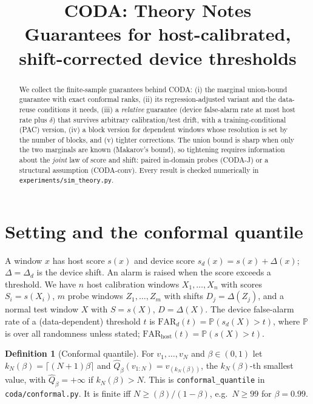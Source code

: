 \documentclass[conference]{IEEEtran}
\theoremstyle{definition}
\newtheorem{definition}{Definition}
\theoremstyle{remark}
\newcommand{\Q}{\widehat Q}
\newcommand{\Prob}{\mathbb P}
\newcommand{\FAR}{\mathrm{FAR}}
\begin{document}
\title{CODA: Theory Notes\\{\normalsize Guarantees for host-calibrated, shift-corrected device thresholds}}
\author{}
\maketitle

\begin{abstract}
We collect the finite-sample guarantees behind CODA: (i) the marginal union-bound guarantee with exact conformal ranks, (ii) its regression-adjusted variant and the data-reuse conditions it needs, (iii) a \emph{relative} guarantee (device false-alarm rate at most host rate plus $\delta$) that survives arbitrary calibration/test drift, with a training-conditional (PAC) version, (iv) a block version for dependent windows whose resolution is set by the number of blocks, and (v) tighter corrections. The union bound is sharp when only the two marginals are known (Makarov's bound), so tightening requires information about the \emph{joint} law of score and shift: paired in-domain probes (CODA-J) or a structural assumption (CODA-conv). Every result is checked numerically in \texttt{experiments/sim\_theory.py}.
\end{abstract}

\section{Setting and the conformal quantile}
A window $x$ has host score $s(x)$ and device score $s_d(x)=s(x)+\Delta(x)$; $\Delta=\Delta_d$ is the device shift. An alarm is raised when the score exceeds a threshold. We have $n$ host calibration windows $X_1,\dots,X_n$ with scores $S_i=s(X_i)$, $m$ probe windows $Z_1,\dots,Z_m$ with shifts $D_j=\Delta(Z_j)$, and a normal test window $X$ with $S=s(X)$, $D=\Delta(X)$. The device false-alarm rate of a (data-dependent) threshold $t$ is $\FAR_d(t)=\Prob(s_d(X)>t)$, where $\Prob$ is over all randomness unless stated; $\FAR_{\mathrm{host}}(t)=\Prob(s(X)>t)$.

\begin{definition}[Conformal quantile]
For $v_1,\dots,v_N$ and $\beta\in(0,1)$ let $k_N(\beta)=\lceil (N+1)\beta\rceil$ and $\Q_\beta(v_{1:N})=v_{(k_N(\beta))}$, the $k_N(\beta)$-th smallest value, with $\Q_\beta=+\infty$ if $k_N(\beta)>N$. This is \texttt{conformal\_quantile} in \texttt{coda/conformal.py}. It is finite iff $N\ge (\beta)/(1-\beta)$, e.g.\ $N\ge 99$ for $\beta=0.99$.
\end{definition}
\end{document}

